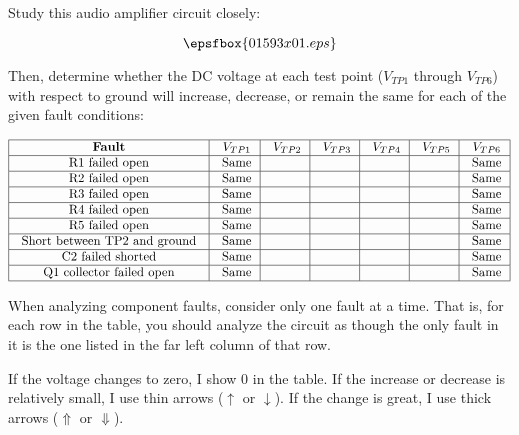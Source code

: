 

Study this audio amplifier circuit closely:

$$\epsfbox{01593x01.eps}$$

Then, determine whether the DC voltage at each test point ($V_{TP1}$ through $V_{TP6}$) with respect to ground will increase, decrease, or remain the same for each of the given fault conditions:


$$\vbox{\offinterlineskip
\halign{\strut
\vrule \quad\hfil # \ \hfil & 
\vrule \quad\hfil $#$ \ \hfil & 
\vrule \quad\hfil $#$ \ \hfil & 
\vrule \quad\hfil $#$ \ \hfil & 
\vrule \quad\hfil $#$ \ \hfil & 
\vrule \quad\hfil $#$ \ \hfil & 
\vrule \quad\hfil $#$ \ \hfil \vrule \cr 
\noalign{\hrule}
%
{\bf Fault} & V_{TP1} & V_{TP2} & V_{TP3} & V_{TP4} & V_{TP5} & V_{TP6} \cr
\noalign{\hrule}
%
R1 failed open & \hbox{Same} &  &  &  &  & \hbox{Same} \cr
\noalign{\hrule}
%
R2 failed open & \hbox{Same} &  &  &  &  & \hbox{Same} \cr
\noalign{\hrule}
%
R3 failed open & \hbox{Same} &  &  &  &  & \hbox{Same} \cr
\noalign{\hrule}
%
R4 failed open & \hbox{Same} &  &  &  &  & \hbox{Same} \cr
\noalign{\hrule}
%
R5 failed open & \hbox{Same} &  &  &  &  & \hbox{Same} \cr
\noalign{\hrule}
%
Short between TP2 and ground & \hbox{Same} &  &  &  &  & \hbox{Same} \cr
\noalign{\hrule}
%
C2 failed shorted & \hbox{Same} &  &  &  &  & \hbox{Same} \cr
\noalign{\hrule}
%
Q1 collector failed open & \hbox{Same} &  &  &  &  & \hbox{Same} \cr
\noalign{\hrule}
} %
}$$ %

When analyzing component faults, consider only one fault at a time.  That is, for each row in the table, you should analyze the circuit as though the only fault in it is the one listed in the far left column of that row.









If the voltage changes to zero, I show $0$ in the table.  If the increase or decrease is relatively small, I use thin arrows ($\uparrow$ or $\downarrow$).  If the change is great, I use thick arrows ($\Uparrow$ or $\Downarrow$).

